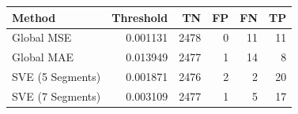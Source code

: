 \begin{tabular}{lrrrrr}
\toprule
Method & Threshold & TN & FP & FN & TP \\
\midrule
Global MSE & 0.001131 & 2478 & 0 & 11 & 11 \\
Global MAE & 0.013949 & 2477 & 1 & 14 & 8 \\
SVE (5 Segments) & 0.001871 & 2476 & 2 & 2 & 20 \\
SVE (7 Segments) & 0.003109 & 2477 & 1 & 5 & 17 \\
\bottomrule
\end{tabular}
